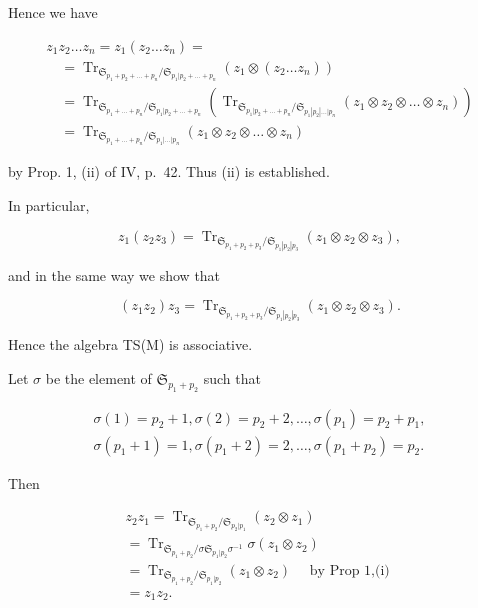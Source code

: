 Hence we have

\[
\begin{array}{l} z _ {1} z _ {2} \dots z _ {n} = z _ {1} (z _ {2} \dots z _ {n}) = \\ \quad = \operatorname{Tr} _ {\mathfrak {S} _ {p _ {1} + p _ {2} + \dots + p _ {n}} / \mathfrak {S} _ {p _ {1} | p _ {2} + \dots + p _ {n}}} (z _ {1} \otimes (z _ {2} \dots z _ {n})) \\ \quad = \operatorname{Tr} _ {\mathfrak {S} _ {p _ {1} + \dots + p _ {n}} / \mathfrak {S} _ {p _ {1} | p _ {2} + \dots + p _ {n}}} (\operatorname{Tr} _ {\mathfrak {S} _ {p _ {1} | p _ {2} + \dots + p _ {n}} / \mathfrak {S} _ {p _ {1} | p _ {2} | \dots | p _ {n}}} (z _ {1} \otimes z _ {2} \otimes \dots \otimes z _ {n})) \\ \quad = \operatorname{Tr} _ {\mathfrak {S} _ {p _ {1} + \dots + p _ {n}} / \mathfrak {S} _ {p _ {1} | \dots | p _ {n}}} (z _ {1} \otimes z _ {2} \otimes \dots \otimes z _ {n}) \end{array}
\]

by Prop. 1, (ii) of IV, p.~42. Thus (ii) is established.

In particular,

\[
z _ {1} \left(z _ {2} z _ {3}\right) = \operatorname{Tr} _ {\mathfrak {S} _ {p _ {1} + p _ {2} + p _ {3}} / \mathfrak {S} _ {p _ {1} | p _ {2} | p _ {3}}} \left(z _ {1} \otimes z _ {2} \otimes z _ {3}\right),
\]

and in the same way we show that

\[
\left(z _ {1} z _ {2}\right) z _ {3} = \operatorname{Tr} _ {\mathfrak {S} _ {p _ {1} + p _ {2} + p _ {3}} / \mathfrak {S} _ {p _ {1} | p _ {2} | p _ {3}}} \left(z _ {1} \otimes z _ {2} \otimes z _ {3}\right).
\]

Hence the algebra TS(M) is associative.

Let \(\sigma\) be the element of \(\mathfrak{S}_{p_1 + p_2}\) such that

\[
\begin{array}{l} \sigma (1) = p _ {2} + 1, \sigma (2) = p _ {2} + 2, \dots , \sigma (p _ {1}) = p _ {2} + p _ {1}, \\ \sigma (p _ {1} + 1) = 1, \sigma (p _ {1} + 2) = 2, \dots , \sigma (p _ {1} + p _ {2}) = p _ {2}. \end{array}
\]

Then

\[
\begin{array}{l} z _ {2} z _ {1} = \operatorname{Tr} _ {\mathfrak {S} _ {p _ {1} + p _ {2}} / \mathfrak {S} _ {p _ {2} | p _ {1}}} (z _ {2} \otimes z _ {1}) \\ = \operatorname{Tr} _ {\mathfrak {S} _ {p _ {1} + p _ {2}} / \sigma \mathfrak {S} _ {p _ {1} | p _ {2}} \sigma^ {- 1}} \sigma (z _ {1} \otimes z _ {2}) \\ = \operatorname{Tr} _ {\mathfrak {S} _ {p _ {1} + p _ {2}} / \mathfrak {S} _ {p _ {1} | p _ {2}}} (z _ {1} \otimes z _ {2}) \quad \text { by   Prop   1,(i) } \\ = z _ {1} z _ {2}. \end{array}
\]

